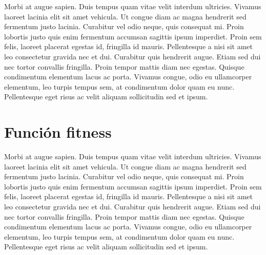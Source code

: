 Morbi at augue sapien. Duis tempus quam vitae velit interdum ultricies. Vivamus laoreet lacinia elit sit amet vehicula. Ut congue diam ac magna hendrerit sed fermentum justo lacinia. Curabitur vel odio neque, quis consequat mi. Proin lobortis justo quis enim fermentum accumsan sagittis ipsum imperdiet. Proin sem felis, laoreet placerat egestas id, fringilla id mauris. Pellentesque a nisi sit amet leo consectetur gravida nec et dui. Curabitur quis hendrerit augue. Etiam sed dui nec tortor convallis fringilla. Proin tempor mattis diam nec egestas. Quisque condimentum elementum lacus ac porta. Vivamus congue, odio eu ullamcorper elementum, leo turpis tempus sem, at condimentum dolor quam eu nunc. Pellentesque eget risus ac velit aliquam sollicitudin sed et ipsum. 

\section{Función fitness}

Morbi at augue sapien. Duis tempus quam vitae velit interdum ultricies. Vivamus laoreet lacinia elit sit amet vehicula. Ut congue diam ac magna hendrerit sed fermentum justo lacinia. Curabitur vel odio neque, quis consequat mi. Proin lobortis justo quis enim fermentum accumsan sagittis ipsum imperdiet. Proin sem felis, laoreet placerat egestas id, fringilla id mauris. Pellentesque a nisi sit amet leo consectetur gravida nec et dui. Curabitur quis hendrerit augue. Etiam sed dui nec tortor convallis fringilla. Proin tempor mattis diam nec egestas. Quisque condimentum elementum lacus ac porta. Vivamus congue, odio eu ullamcorper elementum, leo turpis tempus sem, at condimentum dolor quam eu nunc. Pellentesque eget risus ac velit aliquam sollicitudin sed et ipsum. 
